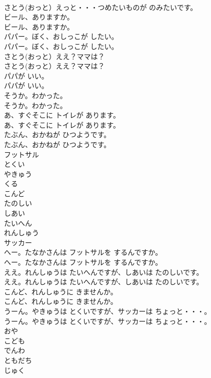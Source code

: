 \documentclass[8pt]{extreport}
\begin{document}
\begin{CJK}{UTF8}{min}
\\	さとう(おっと）えっと・・・つめたいものが のみたいです。 
\\	ビール、ありますか。	
\\	ビール、ありますか。 
\\	パパー。ぼく、おしっこが したい。	
\\	パパー。ぼく、おしっこが したい。 
\\	さとう(おっと）ええ？ママは？	
\\	さとう(おっと）ええ？ママは？ 
\\	パパが いい。	
\\	パパが いい。 
\\	そうか。わかった。	
\\	そうか。わかった。 
\\	あ、すぐそこに トイレが あります。	
\\	あ、すぐそこに トイレが あります。 
\\	たぶん、おかねが ひつようです。	
\\	たぶん、おかねが ひつようです。 
\\	フットサル
\\	とくい
\\	やきゅう
\\	くる
\\	こんど
\\	たのしい
\\	しあい
\\	たいへん
\\	れんしゅう
\\	サッカー
\\	へー。たなかさんは フットサルを するんですか。	
\\	へー。たなかさんは フットサルを するんですか。 
\\	ええ。れんしゅうは たいへんですが、しあいは たのしいです。	
\\	ええ。れんしゅうは たいへんですが、しあいは たのしいです。 
\\	こんど、れんしゅうに きませんか。	
\\	こんど、れんしゅうに きませんか。 
\\	うーん。やきゅうは とくいですが、サッカーは ちょっと・・・。	
\\	うーん。やきゅうは とくいですが、サッカーは ちょっと・・・。 
\\	おや
\\	こども
\\	でんわ
\\	ともだち
\\	じゅく

\end{CJK}
\end{document}
